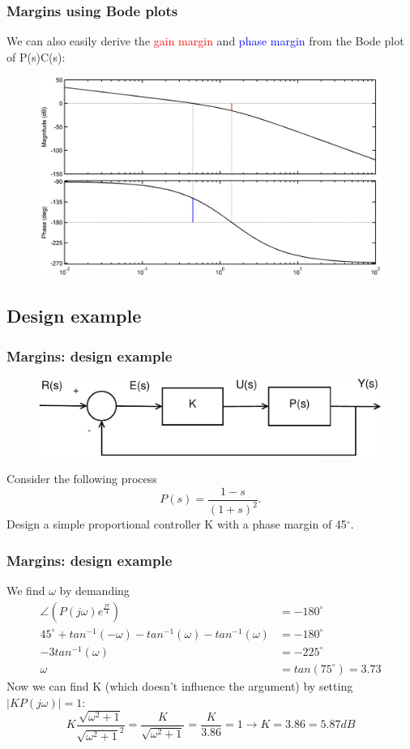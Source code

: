 \begin{frame}
	\frametitle{Margins using Bode plots}
	We can also easily derive the \textcolor{red}{gain margin} and \textcolor{blue}{phase margin} from the Bode plot of P(s)C(s):
	\vspace{-1ex}
	\begin{figure}
		\includegraphics[width=0.87\linewidth]{bode}
	\end{figure}
\end{frame}

\subsection{Design example}

\begin{frame}
	\frametitle{Margins: design example}
	\begin{figure}
		\includegraphics[width=0.8\linewidth]{closedloop2}
	\end{figure}
	Consider the following process $$P(s)=\frac{1-s}{(1+s)^2}.$$
	Design a simple proportional controller K with a phase margin of 45$^{\circ}$.
\end{frame}

\begin{frame}
	\frametitle{Margins: design example}
	We find $\omega$ by demanding
	\begin{align*}
		\angle(P(j\omega)e^{\frac{j\pi}{4}})&=-180^{\circ}\\
		45^{\circ}+tan^{-1}(-\omega) -tan^{-1}(\omega)-tan^{-1}(\omega) &=-180^{\circ}\\
		-3tan^{-1}(\omega)&=-225^{\circ}\\
		\omega &= tan(75^{\circ})=3.73
	\end{align*}
	Now we can find K (which doesn't influence the argument) by setting $\big|KP(j\omega)\big|=1$:
	$$K\frac{\sqrt{\omega^2+1}}{\sqrt{\omega^2+1}^2}=\frac{K}{\sqrt{\omega^2+1}}=\frac{K}{3.86}=1\rightarrow K=3.86=5.87 dB$$
\end{frame}

